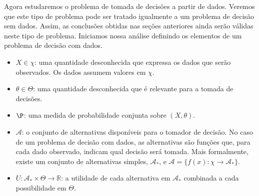 Agora estudaremos o problema de tomada de
decisões  a partir de dados.
Veremos que este tipo de problema
pode ser tratado igualmente a
um problema de decisão sem dados.
Assim, as conclusões obtidas nas seções anteriores
ainda serão válidas neste tipo de problema.
Iniciamos nossa análise definindo os elementos de um 
problema de decisão com dados.

\begin{itemize}
 \item $X \in \chi$: uma quantidade desconhecida que
 expressa os dados que serão observados.
 Os dados assumem valores em $\chi$.
 \item $\theta \in \Theta$: uma quantidade desconhecida
 que é relevante para a tomada de decisões.
 \item $\P$: uma medida de probabilidade conjunta sobre
 $(X,\theta)$.
 \item $\mathcal{A}$: o conjunto de
 alternativas disponíveis para o tomador de decisão.
 No caso de um problema de decisão com dados, as
 alternativas são funções que, para cada
 dado observado, indicam qual decisão será tomada.
 Mais formalmente, existe um conjunto de
 alternativas simples, $\mathcal{A}_{*}$,
 e $\mathcal{A} = \{f(x): \chi \rightarrow \mathcal{A}_{*}\}$.
 \item $U: \mathcal{A}_{*} \times \Theta \rightarrow \mathbb{R}$:
 a utilidade de cada alternativa em $\mathcal{A}_{*}$
 combinada a cada possibilidade em $\Theta$.
\end{itemize}

